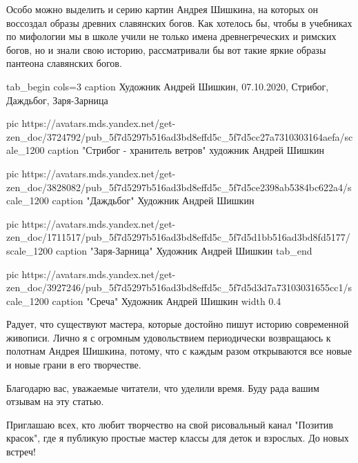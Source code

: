 Особо можно выделить и серию картин Андрея Шишкина, на которых он воссоздал
образы древних славянских богов. Как хотелось бы, чтобы в учебниках по
мифологии мы в школе учили не только имена древнегреческих и римских богов, но
и знали свою историю, рассматривали бы вот такие яркие образы пантеона
славянских богов.


\ifcmt
tab_begin cols=3
	caption Художник Андрей Шишкин, 07.10.2020, Стрибог, Даждьбог, Заря-Зарница

  pic https://avatars.mds.yandex.net/get-zen_doc/3724792/pub_5f7d5297b516ad3bd8effd5c_5f7d5cc27a7310303164aefa/scale_1200
	caption "Стрибог - хранитель ветров" художник Андрей Шишкин

	pic https://avatars.mds.yandex.net/get-zen_doc/3828082/pub_5f7d5297b516ad3bd8effd5c_5f7d5ce2398ab5384bc622a4/scale_1200
	caption "Даждьбог" Художник Андрей Шишкин

	pic https://avatars.mds.yandex.net/get-zen_doc/1711517/pub_5f7d5297b516ad3bd8effd5c_5f7d5d1bb516ad3bd8fd5177/scale_1200
	caption "Заря-Зарница" Художник Андрей Шишкин
tab_end
\fi

\ifcmt
  pic https://avatars.mds.yandex.net/get-zen_doc/3927246/pub_5f7d5297b516ad3bd8effd5c_5f7d5d3d7a73103031655cc1/scale_1200
	caption "Среча" Художник Андрей Шишкин
	width 0.4
\fi

Радует, что существуют мастера, которые достойно пишут историю современной
живописи. Лично я с огромным удовольствием периодически возвращаюсь к полотнам
Андрея Шишкина, потому, что с каждым разом открываются все новые и новые грани
в его творчестве.

Благодарю вас, уважаемые читатели, что уделили время. Буду рада вашим отзывам
на эту статью.

Приглашаю всех, кто любит творчество на свой рисовальный канал "Позитив
красок", где я публикую простые мастер классы для деток и взрослых. До новых
встреч!


